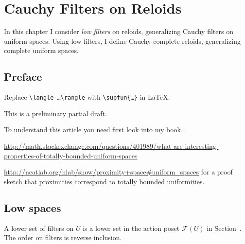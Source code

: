 \chapter{Cauchy Filters on Reloids}

In this chapter I consider \emph{low filters} on reloids, generalizing
Cauchy filters on uniform spaces. Using low filters, I define Cauchy-complete
reloids, generalizing complete uniform spaces.


\section{Preface}

Replace {\tt \textbackslash langle \dots \textbackslash rangle} with {\tt \textbackslash supfun\{\dots\}} in \LaTeX{}.

This is a preliminary partial draft.

To understand this article you need first look into my book \cite{volume-1}.

\url{http://math.stackexchange.com/questions/401989/what-are-interesting-properties-of-totally-bounded-uniform-spaces}

\url{http://ncatlab.org/nlab/show/proximity+space\#uniform\_spaces} for a proof
sketch that proximities correspond to totally bounded uniformities.

\section{Low spaces}


\begin{defn}
A lower set of filters on $U$ is a lower set in the action poset
$\mathscr F(U)$ in Section~.
The order on filters is reverse inclusion.
\end{defn}

